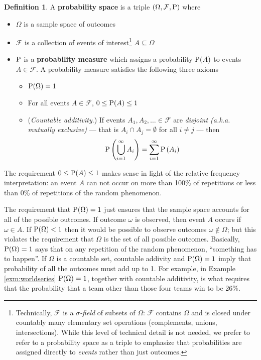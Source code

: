 \documentclass[
]{book}
\providecommand{\tightlist}{%
  \setlength{\itemsep}{0pt}\setlength{\parskip}{0pt}}
\theoremstyle{definition}
\newtheorem{definition}{Definition}[chapter]
\theoremstyle{definition}
\theoremstyle{definition}
\theoremstyle{remark}
\begin{document}
\begin{definition}
\protect\hypertarget{def:probspace}{}{\label{def:probspace} }A \textbf{probability space} is a triple \((\Omega, \mathcal{F}, \textrm{P})\) where

\begin{itemize}
\tightlist
\item
  \(\Omega\) is a sample space of outcomes
\item
  \(\mathcal{F}\) is a collection of events of interest\footnote{Technically, \(\mathcal{F}\) is a \emph{\(\sigma\)-field} of subsets of \(\Omega\): \(\mathcal{F}\) contains \(\Omega\) and is closed under countably many elementary set operations (complements, unions, intersections). While this level of technical detail is not needed, we prefer to refer to a probability space as a triple to emphasize that probabilities are assigned directly to \emph{events} rather than just outcomes.} \(A\subseteq\Omega\)
\item
  \(\textrm{P}\) is a \textbf{probability measure} which assigns a probability \(\textrm{P}(A)\) to events \(A\in\mathcal{F}\). A probability measure satisfies the following three axioms

  \begin{itemize}
  \tightlist
  \item
    \(\textrm{P}(\Omega)=1\)
  \item
    For all events \(A\in\mathcal{F}\), \(0\le \textrm{P}(A)\le 1\)
  \item
    (\emph{Countable additivity}.) If events \(A_1, A_2, \ldots\in\mathcal{F}\) are \emph{disjoint (a.k.a. mutually exclusive)} --- that is \(A_i\cap A_j = \emptyset\) for all \(i\neq j\) --- then
    \begin{equation*}
    \textrm{P}\left(\bigcup_{i=1}^\infty A_i\right) = \sum_{i=1}^\infty \textrm{P}\left(A_i\right)
    \end{equation*}
  \end{itemize}
\end{itemize}
\end{definition}

The requirement \(0\le \textrm{P}(A)\le 1\) makes sense in light of the relative frequency interpretation: an event \(A\) can not occur on more than 100\% of repetitions or less than 0\% of repetitions of the random phenomenon.

The requirement that \(\textrm{P}(\Omega)=1\) just ensures that the sample space accounts for all of the possible outcomes. If outcome \(\omega\) is observed, then event \(A\) occurs if \(\omega\in A\). If \(\textrm{P}(\Omega)<1\) then it would be possible to observe outcomes \(\omega\notin \Omega\); but this violates the requirement that \(\Omega\) is the set of all possible outcomes. Basically, \(\textrm{P}(\Omega)=1\) says that on any repetition of the random phenomenon, ``something has to happen''. If \(\Omega\) is a countable set, countable addivity and \(\textrm{P}(\Omega)=1\) imply that probability of all the outcomes must add up to 1. For example, in Example \ref{exm:worldseries} \(\textrm{P}(\Omega)=1\), together with countable additivity, is what requires that the probability that a team other than those four teams win to be 26\%.
\end{document}
